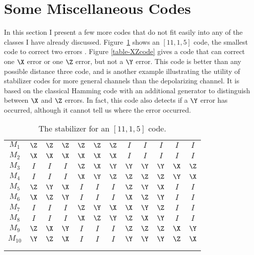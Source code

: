 \section{Some Miscellaneous Codes}

In this section I present a few more codes that do not fit easily
into any of the classes I have already discussed.  Figure~\ref{table-11qubit}
shows an $[11,1,5]$ code, the smallest code to correct two errors
\cite{calderbank-GF4}.  Figure \ref{table-XZcode} gives a code that can
correct one $\X$ error or one $\Z$ error, but not a $\Y$ error.  This code is
better than any possible distance three code, and is another example
illustrating the utility of stabilizer codes for more general channels than the
depolarizing channel.  It is based on the classical Hamming code with an
additional generator to distinguish between $\X$ and $\Z$ errors.  In fact,
this code also detects if a $\Y$ error has occurred, although it cannot tell us
where the error occurred.

\begin{table}
	\centering
	\begin{tabular}{c|ccccccccccc}
		$M_1$ & $\Z$ & $\Z$ & $\Z$ & $\Z$ & $\Z$ & $\Z$ & $I$ & $I$ & $I$ & $I$ & $I$
		\\
		$M_2$ & $\X$ & $\X$ & $\X$ & $\X$ & $\X$ & $\X$ & $I$ & $I$ & $I$ & $I$ & $I$
		\\
		$M_3$ & $I$ & $I$ & $I$ & $\Z$ & $\X$ & $\Y$ & $\Y$ & $\Y$ & $\Y$ & $\X$ & $\Z$
		\\
		$M_4$ & $I$ & $I$ & $I$ & $\X$ & $\Y$ & $\Z$ & $\Z$ & $\Z$ & $\Z$ & $\Y$ & $\X$
		\\
		$M_5$ & $\Z$ & $\Y$ & $\X$ & $I$ & $I$ & $I$ & $\Z$ & $\Y$ & $\X$ & $I$ & $I$
		\\
		$M_6$ & $\X$ & $\Z$ & $\Y$ & $I$ & $I$ & $I$ & $\X$ & $\Z$ & $\Y$ & $I$ & $I$
		\\
		$M_7$ & $I$ & $I$ & $I$ & $\Z$ & $\Y$ & $\X$ & $\X$ & $\Y$ & $\Z$ & $I$ & $I$
		\\
		$M_8$ & $I$ & $I$ & $I$ & $\X$ & $\Z$ & $\Y$ & $\Z$ & $\X$ & $\Y$ & $I$ & $I$
		\\
		$M_9$ & $\Z$ & $\X$ & $\Y$ & $I$ & $I$ & $I$ & $\Z$ & $\Z$ & $\Z$ & $\X$ & $\Y$
		\\
		$M_{10}$ & $\Y$ & $\Z$ & $\X$ & $I$ & $I$ & $I$ & $\Y$ & $\Y$ & $\Y$ & $\Z$ &
		$\X$ \\
		\hline
		\low{$\Xbar$} & \low{$I$} & \low{$I$} & \low{$I$} & \low{$I$} & \low{$I$} &
		\low{$I$} & \low{$\X$} & \low{$\X$} & \low{$\X$} & \low{$\X$} & \low{$\X$} \\
		\low{$\Zbar$} & \low{$I$} & \low{$I$} & \low{$I$} & \low{$I$} & \low{$I$} &
		\low{$I$} & \low{$\Z$} & \low{$\Z$} & \low{$\Z$} & \low{$\Z$} & \low{$\Z$}
	\end{tabular}
	\caption{The stabilizer for an $[11,1,5]$ code.}
	\label{table-11qubit}
\end{table}

